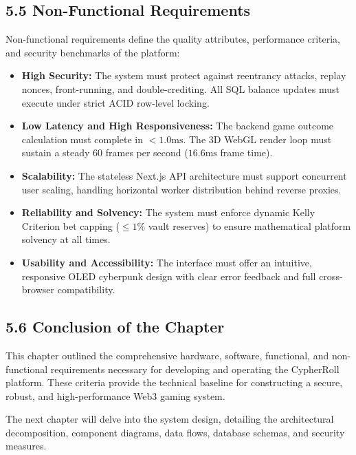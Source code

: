\subsection*{5.5 Non-Functional Requirements}
Non-functional requirements define the quality attributes, performance criteria, and security benchmarks of the platform:
\begin{itemize}[leftmargin=1.5em]
    \item \textbf{High Security:} The system must protect against reentrancy attacks, replay nonces, front-running, and double-crediting. All SQL balance updates must execute under strict ACID row-level locking.
    \item \textbf{Low Latency and High Responsiveness:} The backend game outcome calculation must complete in $< 1.0\text{ms}$. The 3D WebGL render loop must sustain a steady 60 frames per second ($16.6\text{ms}$ frame time).
    \item \textbf{Scalability:} The stateless Next.js API architecture must support concurrent user scaling, handling horizontal worker distribution behind reverse proxies.
    \item \textbf{Reliability and Solvency:} The system must enforce dynamic Kelly Criterion bet capping ($\le 1\%$ vault reserves) to ensure mathematical platform solvency at all times.
    \item \textbf{Usability and Accessibility:} The interface must offer an intuitive, responsive OLED cyberpunk design with clear error feedback and full cross-browser compatibility.
\end{itemize}

\subsection*{5.6 Conclusion of the Chapter}
This chapter outlined the comprehensive hardware, software, functional, and non-functional requirements necessary for developing and operating the CypherRoll platform. These criteria provide the technical baseline for constructing a secure, robust, and high-performance Web3 gaming system.

The next chapter will delve into the system design, detailing the architectural decomposition, component diagrams, data flows, database schemas, and security measures.
\label{chap:requirements_end}
